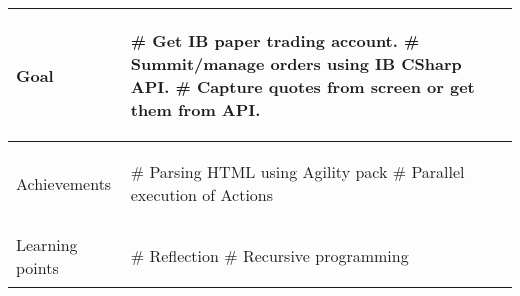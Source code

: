 \begin{table}
\begin{tabular}{p{3cm}|p{8cm}} \hline
Goal & 
\begin{listb}
# Get IB paper trading account.
# Summit/manage orders using IB CSharp API.
# Capture quotes from screen or get them from API. 
\end{listb} \\ \hline
Achievements &
\begin{listb}
# Parsing HTML using Agility pack
# Parallel execution of Actions
\end{listb} \\ \hline
Learning points &
\begin{listb}
# Reflection
# Recursive programming
\end{listb} \\ \hline

\end{tabular}
\end{table}
